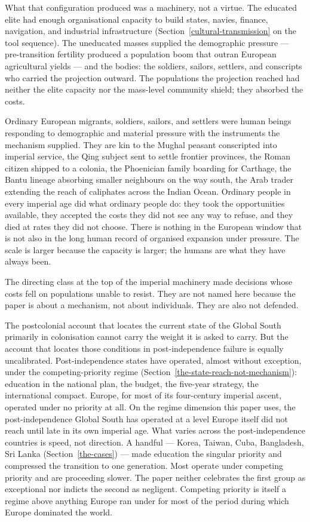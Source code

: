 \documentclass[12pt,letterpaper]{article}
\begin{document}
What that configuration produced was a machinery, not a virtue. The
educated elite had enough organisational capacity to build states,
navies, finance, navigation, and industrial infrastructure
(Section~\ref{cultural-transmission} on the tool sequence). The
uneducated masses supplied the demographic pressure --- pre-transition
fertility produced a population boom that outran European agricultural
yields --- and the bodies: the soldiers, sailors, settlers, and
conscripts who carried the projection outward. The populations the
projection reached had neither the elite capacity nor the mass-level
community shield; they absorbed the costs.

Ordinary European migrants, soldiers, sailors, and settlers were human
beings responding to demographic and material pressure with the
instruments the mechanism supplied. They are kin to the Mughal peasant
conscripted into imperial service, the Qing subject sent to settle
frontier provinces, the Roman citizen shipped to a colonia, the
Phoenician family boarding for Carthage, the Bantu lineage absorbing
smaller neighbours on the way south, the Arab trader extending the
reach of caliphates across the Indian Ocean. Ordinary people in every
imperial age did what ordinary people do: they took the opportunities
available, they accepted the costs they did not see any way to refuse,
and they died at rates they did not choose. There is nothing in the
European window that is not also in the long human record of organised
expansion under pressure. The scale is larger because the capacity is
larger; the humans are what they have always been.

The directing class at the top of the imperial machinery made
decisions whose costs fell on populations unable to resist. They are
not named here because the paper is about a mechanism, not about
individuals. They are also not defended.

The postcolonial account that locates the current state of the Global
South primarily in colonisation cannot carry the weight it is asked to
carry. But the account that locates those conditions in
post-independence failure is equally uncalibrated. Post-independence
states have operated, almost without exception, under the
competing-priority regime
(Section~\ref{the-state-reach-not-mechanism}): education in the
national plan, the budget, the five-year strategy, the international
compact. Europe, for most of its four-century imperial ascent,
operated under no priority at all. On the regime dimension this paper
uses, the post-independence Global South has operated at a level
Europe itself did not reach until late in its own imperial age. What
varies across the post-independence countries is speed, not direction.
A handful --- Korea, Taiwan, Cuba, Bangladesh, Sri Lanka
(Section~\ref{the-cases}) --- made education the singular priority and
compressed the transition to one generation. Most operate under
competing priority and are proceeding slower. The paper neither
celebrates the first group as exceptional nor indicts the second as
negligent. Competing priority is itself a regime above anything Europe
ran under for most of the period during which Europe dominated the
world.
\end{document}
